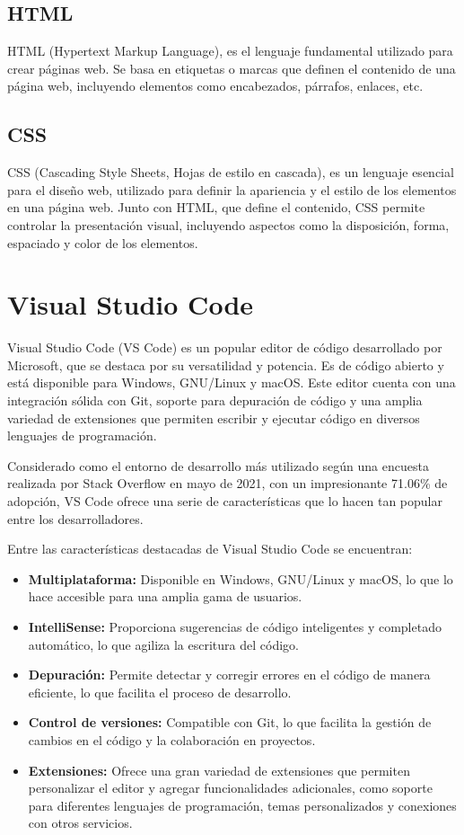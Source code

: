 \subsection{HTML}
HTML \cite{html} (Hypertext Markup Language), es el lenguaje fundamental utilizado para crear páginas web. Se basa en etiquetas o marcas que definen el contenido de una página web, incluyendo elementos como encabezados, párrafos, enlaces, etc.

\subsection{CSS}
CSS \cite{css} (Cascading Style Sheets, Hojas de estilo en cascada), es un lenguaje esencial para el diseño web, utilizado para definir la apariencia y el estilo de los elementos en una página web. Junto con HTML, que define el contenido, CSS permite controlar la presentación visual, incluyendo aspectos como la disposición, forma, espaciado y color de los elementos.


\section{Visual Studio Code}
Visual Studio Code \cite{vscode} (VS Code) es un popular editor de código desarrollado por Microsoft, que se destaca por su versatilidad y potencia. Es de código abierto y está disponible para Windows, GNU/Linux y macOS. Este editor cuenta con una integración sólida con Git, soporte para depuración de código y una amplia variedad de extensiones que permiten escribir y ejecutar código en diversos lenguajes de programación.

Considerado como el entorno de desarrollo más utilizado según una encuesta realizada por Stack Overflow en mayo de 2021, con un impresionante 71.06\% de adopción, VS Code ofrece una serie de características que lo hacen tan popular entre los desarrolladores.

Entre las características destacadas de Visual Studio Code se encuentran:
\begin{itemize}
\tightlist
    \item
         \textbf{Multiplataforma:} Disponible en Windows, GNU/Linux y macOS, lo que lo hace accesible para una amplia gama de usuarios.
    \item 
        \textbf{IntelliSense:} Proporciona sugerencias de código inteligentes y completado automático, lo que agiliza la escritura del código.
    \item 
        \textbf{Depuración:} Permite detectar y corregir errores en el código de manera eficiente, lo que facilita el proceso de desarrollo.
    \item 
        \textbf{Control de versiones:} Compatible con Git, lo que facilita la gestión de cambios en el código y la colaboración en proyectos.
    \item 
        \textbf{Extensiones:} Ofrece una gran variedad de extensiones que permiten personalizar el editor y agregar funcionalidades adicionales, como soporte para diferentes lenguajes de programación, temas personalizados y conexiones con otros servicios.
\end{itemize}

